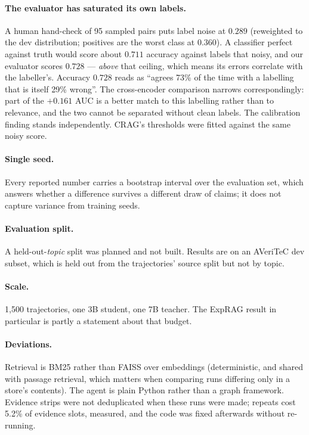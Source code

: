 \documentclass[11pt]{article}
\begin{document}
\paragraph{The evaluator has saturated its own labels.} A human hand-check of 95
sampled pairs puts label noise at $0.289$ (reweighted to the dev distribution;
positives are the worst class at $0.360$). A classifier perfect against truth
would score about $0.711$ accuracy against labels that noisy, and our evaluator
scores $0.728$ --- \emph{above} that ceiling, which means its errors correlate
with the labeller's. Accuracy $0.728$ reads as ``agrees 73\% of the time with a
labelling that is itself 29\% wrong''. The cross-encoder comparison narrows
correspondingly: part of the $+0.161$ AUC is a better match to this labelling
rather than to relevance, and the two cannot be separated without clean labels.
The calibration finding stands independently. CRAG's thresholds were fitted
against the same noisy score.

\paragraph{Single seed.} Every reported number carries a bootstrap interval over
the evaluation set, which answers whether a difference survives a different draw
of claims; it does not capture variance from training seeds.

\paragraph{Evaluation split.} A held-out-\emph{topic} split was planned and not
built. Results are on an AVeriTeC dev subset, which is held out from the
trajectories' source split but not by topic.

\paragraph{Scale.} 1{,}500 trajectories, one 3B student, one 7B teacher. The
ExpRAG result in particular is partly a statement about that budget.

\paragraph{Deviations.} Retrieval is BM25 rather than FAISS over embeddings
(deterministic, and shared with passage retrieval, which matters when comparing
runs differing only in a store's contents). The agent is plain Python rather
than a graph framework. Evidence strips were not deduplicated when these runs
were made; repeats cost 5.2\% of evidence slots, measured, and the code was
fixed afterwards without re-running.
\end{document}
